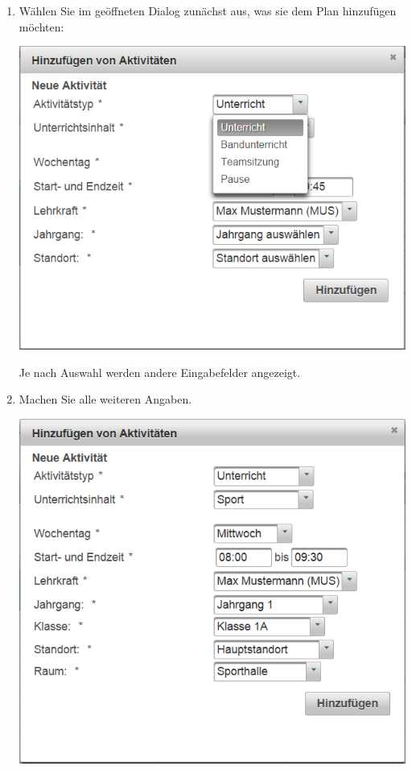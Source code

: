 \documentclass[fontsize=12pt]{scrartcl}
\begin{document}
\begin{enumerate}
\item Wählen Sie im geöffneten Dialog zunächst aus, was sie dem Plan hinzufügen möchten: \medskip\\
	\begin{minipage}[t]{\linewidth}
            \includegraphics[width=.8\linewidth]{images/addActivity.png}
    \end{minipage} 
    \medskip
    Je nach Auswahl werden andere Eingabefelder angezeigt.
    \clearpage
\item Machen Sie alle weiteren Angaben.\medskip\\
	\begin{minipage}[t]{\linewidth}
            \includegraphics[width=.8\linewidth]{images/addActivity2.png}
    \end{minipage} 
    \medskip\\

\end{enumerate}
\end{document}
